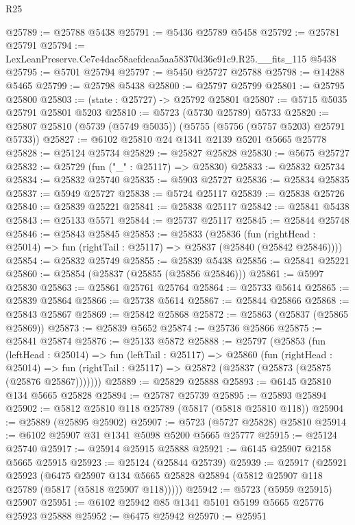 \begin{lexlean}{R25}
\begin{coremodule}
@25789 := @25788 @5438
@25791 := @5436 @25789 @5458
@25792 := @25781 @25791
@25794 := LexLeanPreserve.Ce7e4dac58aefdeaa5aa58370d36e91c9.R25.__fits_115 @5438
@25795 := @5701 @25794
@25797 := @5450 @25727 @25788
@25798 := @14288 @5465
@25799 := @25798 @5438
@25800 := @25797 @25799
@25801 := @25795 @25800
@25803 := (state : @25727) -> @25792 @25801
@25807 := @5715 @5035 @25791 @25801 @5203
@25810 := @5723 (@5730 @25789) @5733
@25820 := @25807 @25810 (@5739 (@5749 @5035)) (@5755 (@5756 (@5757 @5203) @25791 @5733))
@25827 := @6102 @25810 @24 @1341 @2139 @5201 @5665 @25778
@25828 := @25124 @25734
@25829 := @25827 @25828
@25830 := @5675 @25727
@25832 := @25729 (fun ("_" : @25117) => @25830)
@25833 := @25832 @25734
@25834 := @25832 @25740
@25835 := @5903 @25727
@25836 := @25834 @25835
@25837 := @5949 @25727
@25838 := @5724 @25117
@25839 := @25838 @25726
@25840 := @25839 @25221
@25841 := @25838 @25117
@25842 := @25841 @5438
@25843 := @25133 @5571
@25844 := @25737 @25117
@25845 := @25844 @25748
@25846 := @25843 @25845
@25853 := @25833
    (@25836
      (fun (rightHead : @25014) => fun (rightTail : @25117) => @25837 (@25840 (@25842 @25846))))
@25854 := @25832 @25749
@25855 := @25839 @5438
@25856 := @25841 @25221
@25860 := @25854 (@25837 (@25855 (@25856 @25846)))
@25861 := @5997 @25830
@25863 := @25861 @25761 @25764
@25864 := @25733 @5614
@25865 := @25839 @25864
@25866 := @25738 @5614
@25867 := @25844 @25866
@25868 := @25843 @25867
@25869 := @25842 @25868
@25872 := @25863 (@25837 (@25865 @25869))
@25873 := @25839 @5652
@25874 := @25736 @25866
@25875 := @25841 @25874
@25876 := @25133 @5872
@25888 := @25797
    (@25853
      (fun (leftHead : @25014) =>
      fun (leftTail : @25117) =>
      @25860
        (fun (rightHead : @25014) =>
        fun (rightTail : @25117) => @25872 (@25837 (@25873 (@25875 (@25876 @25867)))))))
@25889 := @25829 @25888
@25893 := @6145 @25810 @134 @5665 @25828
@25894 := @25787 @25739
@25895 := @25893 @25894
@25902 := @5812 @25810 @118 @25789 (@5817 (@5818 @25810 @118))
@25904 := @25889 (@25895 @25902)
@25907 := @5723 (@5727 @25828) @25810
@25914 := @6102 @25907 @31 @1341 @5098 @5200 @5665 @25777
@25915 := @25124 @25740
@25917 := @25914 @25915 @25888
@25921 := @6145 @25907 @2158 @5665 @25915
@25923 := @25124 (@25844 @25739)
@25939 := @25917
    (@25921
      @25923
      (@6475
        @25907
        @134
        @5665
        @25828
        @25894
        (@5812 @25907 @118 @25789 (@5817 (@5818 @25907 @118)))))
@25942 := @5723 (@5959 @25915) @25907
@25951 := @6102 @25942 @85 @1341 @5101 @5199 @5665 @25776 @25923 @25888
@25952 := @6475 @25942
@25970 := @25951

\end{coremodule}
\end{lexlean}

